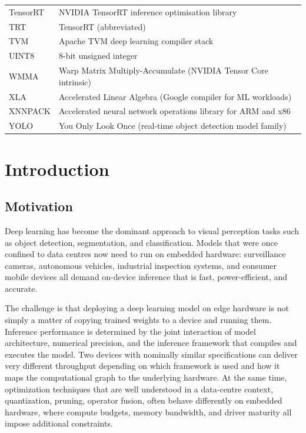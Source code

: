 \documentclass[12pt,a4paper]{report}
\begin{document}
\begin{longtable}{@{}p{3cm}p{10cm}@{}}
TensorRT     & NVIDIA TensorRT inference optimisation library \\[2pt]
TRT          & TensorRT (abbreviated) \\[2pt]
TVM          & Apache TVM deep learning compiler stack \\[2pt]
UINT8        & 8-bit unsigned integer \\[2pt]
WMMA         & Warp Matrix Multiply-Accumulate (NVIDIA Tensor Core intrinsic) \\[2pt]
XLA          & Accelerated Linear Algebra (Google compiler for ML workloads) \\[2pt]
XNNPACK      & Accelerated neural network operations library for ARM and x86 \\[2pt]
YOLO         & You Only Look Once (real-time object detection model family) \\[2pt]

\end{longtable}
\cleardoublepage
\cleardoublepage
\hypersetup{pageanchor=true}

\chapter{Introduction}

\section{Motivation}

Deep learning has become the dominant approach to visual perception tasks such as object detection, segmentation,
and classification.
Models that were once confined to data centres now need to run on embedded hardware: surveillance cameras, autonomous
vehicles, industrial inspection systems, and consumer mobile devices all demand on-device inference that is fast,
power-efficient, and accurate.

The challenge is that deploying a deep learning model on edge hardware is not simply a matter of copying trained
weights to a device and running them.
Inference performance is determined by the joint interaction of model architecture, numerical precision, and the
inference framework that compiles and executes the model.
Two devices with nominally similar specifications can deliver very different throughput depending on which framework
is used and how it maps the computational graph to the underlying hardware.
At the same time, optimization techniques that are well understood in a data-centre context, quantization, pruning,
operator fusion, often behave differently on embedded hardware, where compute budgets, memory bandwidth, and driver
maturity all impose additional constraints.
\end{document}
